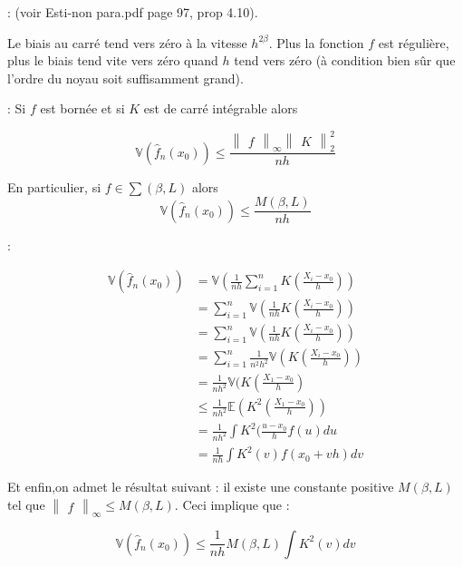 \documentclass[
]{article}
\begin{document}
\begin{demonstration}: (voir Esti-non para.pdf page 97, prop 4.10).\newline

   Le biais au carré tend vers zéro à la vitesse $h^{2\beta}$. Plus la fonction $f$ est régulière, plus le biais tend vite vers zéro quand $h$ tend vers zéro (à condition bien sûr que l'ordre du noyau soit suffisamment grand).\newline
\end{demonstration} 
\begin{proposition}: Si $f$ est bornée et si $K$ est de carré intégrable alors 

$$
\mathbb{V}(\hat {f}_n(x_0)) \leqslant \frac{\begin{Vmatrix}f\end{Vmatrix}_{\infty}\begin{Vmatrix}K\end{Vmatrix}^2_2}{nh}
$$

En particulier, si $f \in \sum(\beta,L)$ alors
$$
\mathbb{V}(\hat{f}_n(x_0))\leqslant\frac{M(\beta, L)}{nh}
$$
\end{proposition}
\begin{demonstration}:


$$
\begin{aligned}
\mathbb{V}(\hat {f}_n(x_0)) &= \mathbb{V}(\frac{1}{nh}\sum_{i=1}^nK(\frac{X_i-x_0}{h})) \\
&=\sum_{i=1}^n\mathbb{V}(\frac{1}{nh}K(\frac{X_i-x_0}{h})) \\
&=\sum_{i=1}^n\mathbb{V}(\frac{1}{nh}K(\frac{X_i-x_0}{h}))  \\           &=\sum_{i=1}^n\frac{1}{n^2h^2}\mathbb{V}(K(\frac{X_i-x_0}{h})) \\
&=\frac{1}{nh^2}\mathbb{V}(K(\frac{X_1-x_0}{h}) \\
&\leqslant \frac{1}{nh^2}\mathbb{E}(K^2(\frac{X_1-x_0}{h})) \\
&=\frac{1}{nh^2}\int K^2(\frac{u-x_0}{h}f(u)du \\
&=\frac{1}{nh}\int K^2(v)f(x_0 +vh)dv
\end{aligned}
$$ 


Et enfin,on admet le résultat suivant : \newline
il existe une constante positive $M(\beta,L)$ tel que $\begin{Vmatrix}f\end{Vmatrix}_{\infty} \leqslant M(\beta, L)$. Ceci implique que :

$$
 \mathbb{V}(\hat {f}_n(x_0))\leqslant\frac{1}{nh}M(\beta, L)\int K^2(v)dv 
$$ 
 \end{demonstration}
\end{document}

